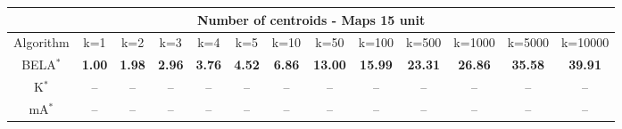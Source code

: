 \begin{tabular}{c|cccccccccccc}\toprule
\multicolumn{13}{c}{Number of centroids - Maps 15 unit}\\ \midrule
Algorithm & k=1 & k=2 & k=3 & k=4 & k=5 & k=10 & k=50 & k=100 & k=500 & k=1000 & k=5000 & k=10000 \\ \midrule
BELA$^*$ & \textbf{1.00} & \textbf{1.98} & \textbf{2.96} & \textbf{3.76} & \textbf{4.52} & \textbf{6.86} & \textbf{13.00} & \textbf{15.99} & \textbf{23.31} & \textbf{26.86} & \textbf{35.58} & \textbf{39.91} \\
K$^*$ & -- & -- & -- & -- & -- & -- & -- & -- & -- & -- & -- & -- \\
mA$^*$ & -- & -- & -- & -- & -- & -- & -- & -- & -- & -- & -- & -- \\ \bottomrule 
\end{tabular}
